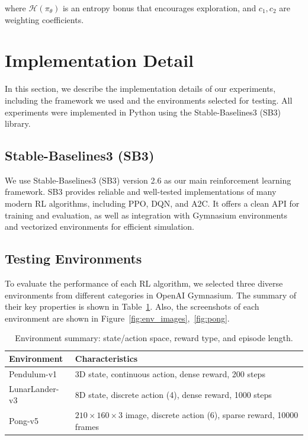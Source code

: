 \documentclass[10pt,twocolumn,letterpaper]{article}
\begin{document}
where \( \mathcal{H}(\pi_\theta) \) is an entropy bonus that encourages exploration, and \( c_1, c_2 \) are weighting coefficients.~\cite{a3c}

\section{Implementation Detail}
\label{sec:implementation}

In this section, we describe the implementation details of our experiments, including the framework we used and the environments selected for testing. All experiments were implemented in Python using the Stable-Baselines3 (SB3) library.

\subsection{Stable-Baselines3 (SB3)}
We use Stable-Baselines3 (SB3) \cite{sb3} version 2.6 as our main reinforcement learning framework. SB3 provides reliable and well-tested implementations of many modern RL algorithms, including PPO, DQN, and A2C. It offers a clean API for training and evaluation, as well as integration with Gymnasium environments and vectorized environments for efficient simulation.

\subsection{Testing Environments}
To evaluate the performance of each RL algorithm, we selected three diverse environments from different categories in OpenAI Gymnasium. The summary of their key properties is shown in Table~\ref{tab:env_comparison}. Also, the screenshots of each environment are shown in Figure~\ref{fig:env_images},~\ref{fig:pong}.

\begin{table}
  \centering
  \begin{tabular}{@{}l>{\raggedright\arraybackslash}p{5.5cm}@{}}
    \toprule
    Environment & Characteristics \\
    \midrule
    Pendulum-v1 & 3D state, continuous action, dense reward, 200 steps \\
    LunarLander-v3 & 8D state, discrete action (4), dense reward, 1000 steps \\
    Pong-v5 & $210 \times 160 \times 3$ image, discrete action (6), sparse reward, 10000 frames \\
    \bottomrule
  \end{tabular}
  \caption{Environment summary: state/action space, reward type, and episode length.}
  \label{tab:env_comparison}
\end{table}
\end{document}
